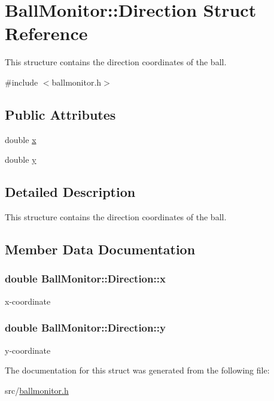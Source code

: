 \hypertarget{structBallMonitor_1_1Direction}{
\section{BallMonitor::Direction Struct Reference}
\label{structBallMonitor_1_1Direction}
}


This structure contains the direction coordinates of the ball.  




{\ttfamily \#include $<$ballmonitor.h$>$}

\subsection*{Public Attributes}
\begin{DoxyCompactItemize}
\item 
double \hyperlink{structBallMonitor_1_1Direction_aa0bde9b600685b464f05bf098857e4ce}{x}
\item 
double \hyperlink{structBallMonitor_1_1Direction_a1228146c1a63d672e59b1e5df760bf68}{y}
\end{DoxyCompactItemize}


\subsection{Detailed Description}
This structure contains the direction coordinates of the ball. 

\subsection{Member Data Documentation}
\hypertarget{structBallMonitor_1_1Direction_aa0bde9b600685b464f05bf098857e4ce}{
\subsubsection[{x}]{\setlength{\rightskip}{0pt plus 5cm}double {\bf BallMonitor::Direction::x}}}
\label{structBallMonitor_1_1Direction_aa0bde9b600685b464f05bf098857e4ce}
x-\/coordinate \hypertarget{structBallMonitor_1_1Direction_a1228146c1a63d672e59b1e5df760bf68}{
\subsubsection[{y}]{\setlength{\rightskip}{0pt plus 5cm}double {\bf BallMonitor::Direction::y}}}
\label{structBallMonitor_1_1Direction_a1228146c1a63d672e59b1e5df760bf68}
y-\/coordinate 

The documentation for this struct was generated from the following file:\begin{DoxyCompactItemize}
\item 
src/\hyperlink{ballmonitor_8h}{ballmonitor.h}\end{DoxyCompactItemize}
